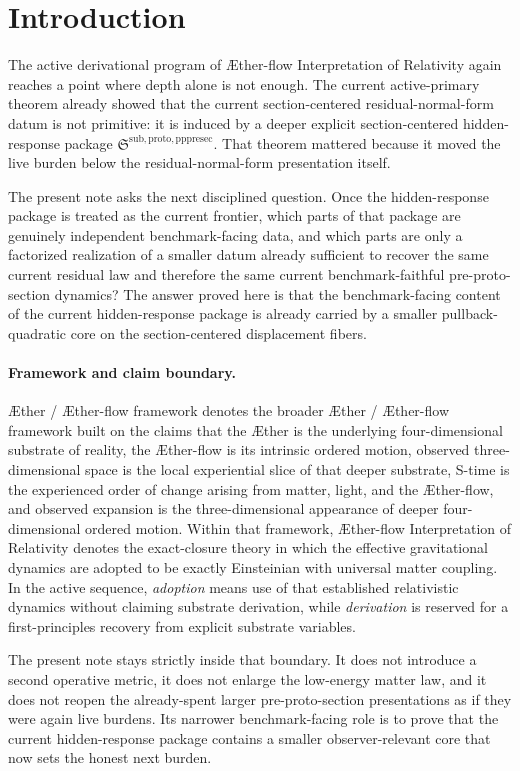 \documentclass[11pt]{article}
\newcommand{\Aether}{\AE{}ther}
\newcommand{\Aflow}{\AE{}ther-flow}
\newcommand{\TheoryName}{\Aflow{} Interpretation of Relativity}
\newcommand{\TheoryProgram}{\Aether{} / \Aflow{} framework}
\newcommand{\PrePreProtoSectionPackage}{\mathfrak S^{\mathrm{sub,proto,pppresec}}}
\begin{document}
\section{Introduction}

The active derivational program of \TheoryName{} again reaches a point where depth alone is not enough. The current active-primary theorem already showed that the current section-centered residual-normal-form datum is not primitive: it is induced by a deeper explicit section-centered hidden-response package \(\PrePreProtoSectionPackage\). That theorem mattered because it moved the live burden below the residual-normal-form presentation itself.

The present note asks the next disciplined question. Once the hidden-response package is treated as the current frontier, which parts of that package are genuinely independent benchmark-facing data, and which parts are only a factorized realization of a smaller datum already sufficient to recover the same current residual law and therefore the same current benchmark-faithful pre-proto-section dynamics? The answer proved here is that the benchmark-facing content of the current hidden-response package is already carried by a smaller pullback-quadratic core on the section-centered displacement fibers.

\paragraph{Framework and claim boundary.}
\TheoryProgram{} denotes the broader \Aether{} / \Aflow{} framework built on the claims that the \Aether{} is the underlying four-dimensional substrate of reality, the \Aflow{} is its intrinsic ordered motion, observed three-dimensional space is the local experiential slice of that deeper substrate, S-time is the experienced order of change arising from matter, light, and the \Aflow{}, and observed expansion is the three-dimensional appearance of deeper four-dimensional ordered motion. Within that framework, \TheoryName{} denotes the exact-closure theory in which the effective gravitational dynamics are adopted to be exactly Einsteinian with universal matter coupling. In the active sequence, \emph{adoption} means use of that established relativistic dynamics without claiming substrate derivation, while \emph{derivation} is reserved for a first-principles recovery from explicit substrate variables.

The present note stays strictly inside that boundary. It does not introduce a second operative metric, it does not enlarge the low-energy matter law, and it does not reopen the already-spent larger pre-proto-section presentations as if they were again live burdens. Its narrower benchmark-facing role is to prove that the current hidden-response package contains a smaller observer-relevant core that now sets the honest next burden.
\end{document}
